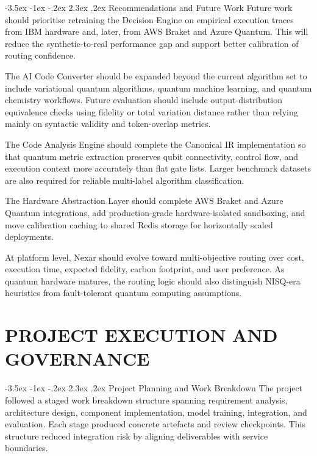\documentclass[12pt,a4paper]{report}
\makeatletter
\renewcommand\section{\@startsection{section}{1}{\z@}%
  {-3.5ex \@plus -1ex \@minus -.2ex}%
  {2.3ex \@plus.2ex}%
  {\normalfont\bfseries\fontsize{12pt}{16pt}\selectfont}}
\makeatother
\begin{document}
\section{Recommendations and Future Work}
Future work should prioritise retraining the Decision Engine on empirical execution traces from IBM hardware and, later, from AWS Braket and Azure Quantum. This will reduce the synthetic-to-real performance gap and support better calibration of routing confidence.

The AI Code Converter should be expanded beyond the current algorithm set to include variational quantum algorithms, quantum machine learning, and quantum chemistry workflows. Future evaluation should include output-distribution equivalence checks using fidelity or total variation distance rather than relying mainly on syntactic validity and token-overlap metrics.

The Code Analysis Engine should complete the Canonical IR implementation so that quantum metric extraction preserves qubit connectivity, control flow, and execution context more accurately than flat gate lists. Larger benchmark datasets are also required for reliable multi-label algorithm classification.

The Hardware Abstraction Layer should complete AWS Braket and Azure Quantum integrations, add production-grade hardware-isolated sandboxing, and move calibration caching to shared Redis storage for horizontally scaled deployments.

At platform level, Nexar should evolve toward multi-objective routing over cost, execution time, expected fidelity, carbon footprint, and user preference. As quantum hardware matures, the routing logic should also distinguish NISQ-era heuristics from fault-tolerant quantum computing assumptions.

\chapter{PROJECT EXECUTION AND GOVERNANCE}

\section{Project Planning and Work Breakdown}
The project followed a staged work breakdown structure spanning requirement analysis, architecture design, component implementation, model training, integration, and evaluation. Each stage produced concrete artefacts and review checkpoints. This structure reduced integration risk by aligning deliverables with service boundaries.
\end{document}
